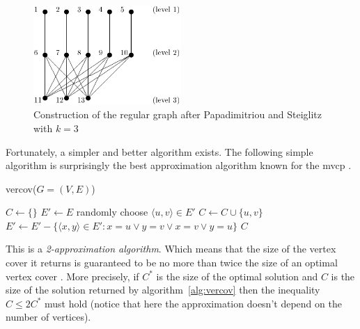 \documentclass[12pt]{article}
\begin{document}
\begin{figure}[!htbp]
\centering
\includegraphics[width=0.5\textwidth]{ps}
\caption[The regular graph after Papadimitriou
and Steiglitz for $k=3$]
{Construction of the regular graph after Papadimitriou
and Steiglitz with $k=3$}
\label{fig:ps}
\end{figure}

Fortunately, a simpler and better algorithm exists.
The following simple algorithm is surprisingly the
best approximation algorithm known for the mvcp \cite[p.~301]{9:mvcp}.

\begin{algorithm}[!htbp]
\caption{vercov($G = (V, E)$)}
\label{alg:vercov}
\begin{algorithmic}[1]

\State $C \gets \{ \}$
\State $E' \gets E$
\State randomly choose $ \langle u, v \rangle \in E'$
\label{alg:rand}
\State $C \gets C \cup \{u, v\}$
\State $E' \gets E' -
\{ \langle x, y \rangle \in E' : x=u \vee y=v \vee x=v \vee y=u \}$
\State {}
\EndWhile
\State \Return $C$

\end{algorithmic}
\end{algorithm}

This is a \textit{2-approximation algorithm}. Which means that
the size of the vertex cover
it returns is guaranteed to be no more than twice the
size of an optimal vertex cover \cite[p.~968]{cormen}.
More precisely, if $C^*$ is the size of the optimal
solution and $C$ is the size of the solution returned by algorithm~\ref{alg:vercov}
then the inequality $C \leq 2C^*$ must hold (notice that here the approximation
doesn't depend on the number of vertices).
\end{document}
